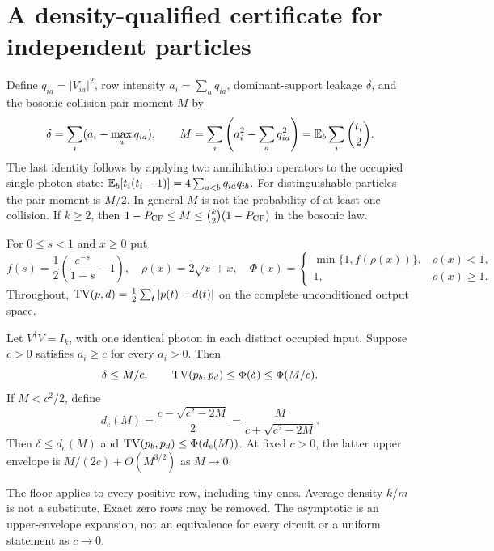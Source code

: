 \section{A density-qualified certificate for independent particles}\label{sec:certificate}
Define $q_{ia}=|V_{ia}|^2$, row intensity $a_i=\sum_aq_{ia}$, dominant-support leakage $\delta$, and the bosonic collision-pair moment $M$ by
\begin{equation}
 \delta=\sum_i(a_i-\max_aq_{ia}),\qquad
 M=\sum_i\left(a_i^2-\sum_aq_{ia}^2\right)
   =\mathbb E_b\sum_i\binom{t_i}{2}.\label{eq:moment}
\end{equation}
The last identity follows by applying two annihilation operators to the occupied single-photon state: $\mathbb E_b[t_i(t_i-1)]=4\sum_{a<b}q_{ia}q_{ib}$. For distinguishable particles the pair moment is $M/2$. In general $M$ is not the probability of at least one collision. If $k\ge2$, then $1-P_{\mathrm{CF}}\le M\le\binom{k}{2}(1-P_{\mathrm{CF}})$ in the bosonic law.

For $0\le s<1$ and $x\ge0$ put
\begin{equation}
 f(s)=\frac12\left(\frac{e^{-s}}{1-s}-1\right),\quad
 \rho(x)=2\sqrt{x}+x,\quad
 \Phi(x)=\begin{cases}\min\{1,f(\rho(x))\},&\rho(x)<1,\\1,&\rho(x)\ge1.\end{cases}\label{eq:envelope}
\end{equation}
Throughout, $\operatorname{TV}(p,d)=\tfrac12\sum_t|p(t)-d(t)|$ on the complete unconditioned output space.

\begin{theorem}\label{thm:density}
Let $V^\dagger V=I_k$, with one identical photon in each distinct occupied input. Suppose $c>0$ satisfies $a_i\ge c$ for every $a_i>0$. Then
\begin{equation}
 \delta\le M/c,\qquad \operatorname{TV}(p_b,p_d)\le\Phi(\delta)\le\Phi(M/c).\label{eq:coarse}
\end{equation}
If $M<c^2/2$, define
\begin{equation}
 d_c(M)=\frac{c-\sqrt{c^2-2M}}2
       =\frac{M}{c+\sqrt{c^2-2M}}.
\end{equation}
Then $\delta\le d_c(M)$ and $\operatorname{TV}(p_b,p_d)\le\Phi(d_c(M))$. At fixed $c>0$, the latter upper envelope is $M/(2c)+O(M^{3/2})$ as $M\to0$.
\end{theorem}
The floor applies to every positive row, including tiny ones. Average density $k/m$ is not a substitute. Exact zero rows may be removed. The asymptotic is an upper-envelope expansion, not an equivalence for every circuit or a uniform statement as $c\to0$.

